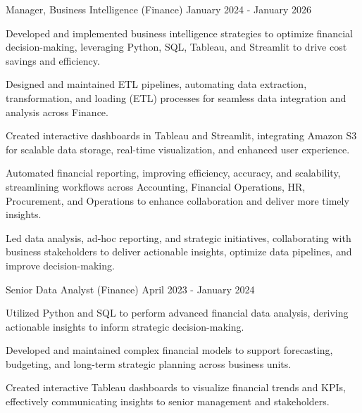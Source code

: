 \begin{cventries}
\cventry
  {Manager, Business Intelligence (Finance)} %
  {} %
  {} %
  {January 2024 - January 2026} %
  {
    \begin{cvitems} %
      \item {Developed and implemented business intelligence strategies to optimize financial decision-making, leveraging Python, SQL, Tableau, and Streamlit to drive cost savings and efficiency.}
      \item {Designed and maintained ETL pipelines, automating data extraction, transformation, and loading (ETL) processes for seamless data integration and analysis across Finance.}
      \item {Created interactive dashboards in Tableau and Streamlit, integrating Amazon S3 for scalable data storage, real-time visualization, and enhanced user experience.}
      \item {Automated financial reporting, improving efficiency, accuracy, and scalability, streamlining workflows across Accounting, Financial Operations, HR, Procurement, and Operations to enhance collaboration and deliver more timely insights.}
      \item {Led data analysis, ad-hoc reporting, and strategic initiatives, collaborating with business stakeholders to deliver actionable insights, optimize data pipelines, and improve decision-making.}
    \end{cvitems}
  }

\cventry
  {Senior Data Analyst (Finance)} %
  {} %
  {} %
  {April 2023 - January 2024} %
  {
    \begin{cvitems} %
      \item {Utilized Python and SQL to perform advanced financial data analysis, deriving actionable insights to inform strategic decision-making.}
      \item {Developed and maintained complex financial models to support forecasting, budgeting, and long-term strategic planning across business units.}
      \item {Created interactive Tableau dashboards to visualize financial trends and KPIs, effectively communicating insights to senior management and stakeholders.}
    \end{cvitems}
  }


\end{cventries}
